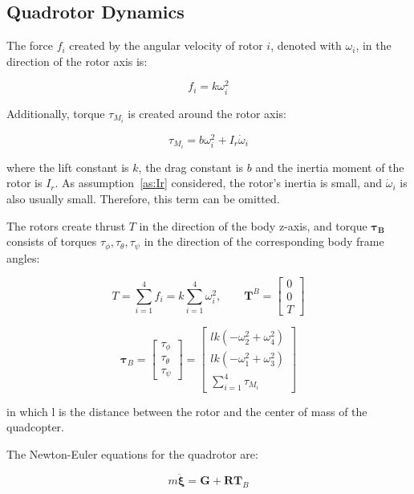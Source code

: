 \documentclass[letterpaper, 10 pt, conference]{ieeeconf}  %
\begin{document}
 \subsection{Quadrotor Dynamics}

The force $f_i$ created by the angular velocity of rotor $i$, denoted with $\omega_i$, in the direction of the rotor axis is:

$$f_{i}=k \omega_{i}^{2}$$

Additionally, torque $\tau_{M_i}$ is created around the rotor axis:

$$\tau_{M_{i}} = b \omega_{i}^{2} + I_{r} \dot{\omega}_{i} $$

where the lift constant is $k$, the drag constant is $b$ and the inertia moment of the rotor is $I_{r}$. As assumption~\ref{as:Ir} considered, the rotor's inertia is small, and $\dot{\omega}_{i}$ is also usually small. Therefore, this term can be omitted.

The rotors create thrust $T$ in the direction of the body z-axis, and torque $\bm{\tau_B}$ consists of torques $\tau_\phi, \tau_\theta, \tau_\psi$ in the direction of the corresponding body frame angles:

$$T=\sum_{i=1}^{4} f_{i}=k \sum_{i=1}^{4} \omega_{i}^{2}, \quad \quad \boldsymbol{T}^{B}=\left[ \begin{array}{c}{0} \\ {0} \\ {T}\end{array}\right]$$

$$
\boldsymbol{\tau}_{B}=\left[ \begin{array}{c}{\tau_{\phi}} \\ {\tau_{\theta}} \\ {\tau_{\psi}}\end{array}\right]=
\left[ \begin{array}{c}{l k\left(-\omega_{2}^{2}+\omega_{4}^{2}\right)} \\ {l k\left(-\omega_{1}^{2}+\omega_{3}^{2}\right)} \\ {\sum_{i=1}^{4} \tau_{M_{i}}}\end{array}\right]
$$

in which l is the distance between the rotor and the center of mass of the quadcopter.

The Newton-Euler equations for the quadrotor are:

$$m \ddot{\boldsymbol{\xi}}=\boldsymbol{G}+\boldsymbol{R} \boldsymbol{T}_{B}$$
\end{document}
